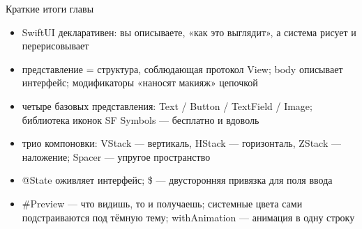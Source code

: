 \begin{tcbsummary}{Краткие итоги главы}
\begin{itemize}
  \item SwiftUI декларативен: вы описываете, «как это выглядит», а система рисует и перерисовывает
  \item представление = структура, соблюдающая протокол View; body описывает интерфейс; модификаторы «наносят макияж» цепочкой
  \item четыре базовых представления: Text / Button / TextField / Image; библиотека иконок SF Symbols — бесплатно и вдоволь
  \item трио компоновки: VStack — вертикаль, HStack — горизонталь, ZStack — наложение; Spacer — упругое пространство
  \item @State оживляет интерфейс; \$ — двусторонняя привязка для поля ввода
  \item \#Preview — что видишь, то и получаешь; системные цвета сами подстраиваются под тёмную тему; withAnimation — анимация в одну строку
\end{itemize}

\end{tcbsummary}
